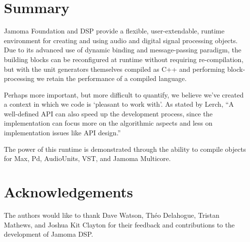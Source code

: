 \documentclass[twoside,10pt]{article}
\begin{document}



\section{Summary} %

Jamoma Foundation and DSP provide a flexible, user-extendable, runtime environment for creating and using audio and digital signal processing objects.  Due to its advanced use of dynamic binding and message-passing paradigm, the building blocks can be reconfigured at runtime without requiring re-compilation, but with the unit generators themselves compiled as C++ and performing block-processing we retain the performance of a compiled language.

Perhaps more important, but more difficult to quantify, we believe we've created a context in which we code is `pleasant to work with'.  As stated by Lerch, ``A well-defined API can also speed up the development process, since the implementation can focus more on the algorithmic aspects and less on implementation issues like API design.'' \cite{Lerch:2005}

The power of this runtime is demonstrated through the ability to compile objects for Max, Pd, AudioUnits, VST, and Jamoma Multicore.




\section{Acknowledgements} %

The authors would like to thank Dave Watson, Th\'eo Delahogue, Tristan Mathews, and Joshua Kit Clayton for their feedback and contributions to the development of Jamoma DSP.





\end{document}
